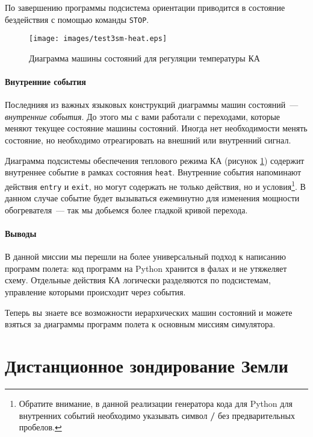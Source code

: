 \documentclass[12pt,a4paper]{article}
\begin{document}
По завершению программы подсистема ориентации приводится в состояние бездействия с помощью
команды \verb'STOP'.

\begin{figure}[tbh]
  \begin{center}
    \texttt{[image: images/test3sm-heat.eps]}
    \caption{Диаграмма машины состояний для регуляции температуры КА}
    \label{Pic:Test3SM-Heat}
  \end{center}
\end{figure}

\paragraph{Внутренние события}

Последнияя из важных языковых конструкций диаграммы машин состояний~--- \emph{внутренние
  события}. До этого мы с вами работали с переходами, которые меняют текущее состояние машины
состояний. Иногда нет необходимости менять состояние, но необходимо отреагировать на
внешний или внутренний сигнал.

Диаграмма подсистемы обеспечения теплового режима КА (рисунок \ref{Pic:Test3SM-Heat})
содержит внутреннее событие в рамках состояния \verb'heat'. Внутренние события напоминают
действия \verb'entry' и \verb'exit', но могут содержать не только действия, но и
условия\footnote{Обратите внимание, в данной реализации генератора кода для Python для
  внутренних событий необходимо указывать символ \textbf{/} без предварительных
  пробелов.}. В данном случае событие будет вызываться ежеминутно для изменения мощности
обогревателя~--- так мы добьемся более гладкой кривой перехода.  

\paragraph{Выводы}

В данной миссии мы перешли на более универсальный подход к написанию программ полета: код
программ на Python хранится в фалах и не утяжеляет схему. Отдельные действия КА
логически разделяются по подсистемам, управление которыми происходит через события.

Теперь вы знаете все возможности иерархических машин состояний и можете взяться за
диаграммы программ полета к основным миссиям симулятора.

\section{Дистанционное зондирование Земли}
\end{document}
